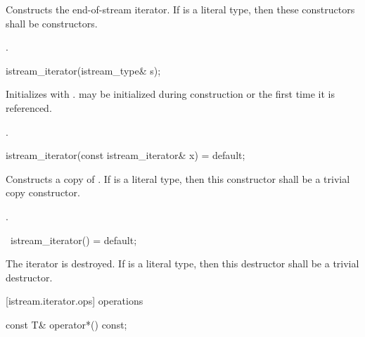 \begin{itemdescr}
\pnum
\effects
Constructs the end-of-stream iterator. If  is a literal type, then these
constructors shall be  constructors.

\pnum
\postcondition {}.
\end{itemdescr}

%
\begin{itemdecl}
istream_iterator(istream_type& s);
\end{itemdecl}

\begin{itemdescr}
\pnum
\effects
Initializes  with .  may be initialized during
construction or the first time it is referenced.

\pnum
\postcondition {}.
\end{itemdescr}

%
\begin{itemdecl}
istream_iterator(const istream_iterator& x) = default;
\end{itemdecl}

\begin{itemdescr}
\pnum
\effects
Constructs a copy of . If  is a literal type, then this constructor shall be a trivial copy constructor.

\pnum
\postcondition {}.
\end{itemdescr}

%
\begin{itemdecl}
~istream_iterator() = default;
\end{itemdecl}

\begin{itemdescr}
\pnum
\effects
The iterator is destroyed. If  is a literal type, then this destructor shall be a trivial destructor.
\end{itemdescr}

[istream.iterator.ops]{ operations}

%
%
\begin{itemdecl}
const T& operator*() const;
\end{itemdecl}

